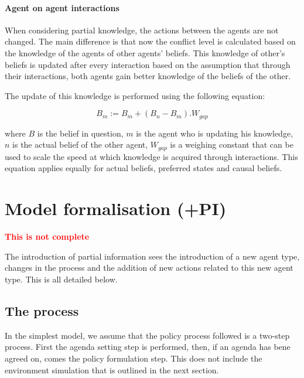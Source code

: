 \documentclass[11pt]{article}
\begin{document}
\paragraph{Agent on agent interactions}

When considering partial knowledge, the actions between the agents are not changed. The main difference is that now the conflict level is calculated based on the knowledge of the agents of other agents' beliefs. This knowledge of other's beliefs is updated after every interaction based on the assumption that through their interactions, both agents gain better knowledge of the beliefs of the other.

The update of this knowledge is performed using the following equation:

\begin{equation}
B_{m} := B_{m} + (B_{n} - B_{m}). W_{gap}
\end{equation}

where $B$ is the belief in question, $m$ is the agent who is updating his knowledge, $n$ is the actual belief of the other agent, $W_{gap}$ is a weighing constant that can be used to scale the speed at which knowledge is acquired through interactions. This equation applies equally for actual beliefs, preferred states and causal beliefs.



\section{Model formalisation (+PI)}

{\bfseries \textcolor{red}{This is not complete}}

The introduction of partial information sees the introduction of a new agent type, changes in the process and the addition of new actions related to this new agent type. This is all detailed below.

\subsection{The process}

In the simplest model, we assume that the policy process followed is a two-step process. First the agenda setting step is performed, then, if an agenda has bene agreed on, comes the policy formulation step. This does not include the environment simulation that is outlined in the next section.
\end{document}
